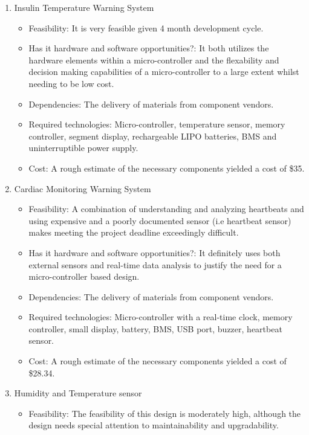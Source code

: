 \begin{enumerate}
  \item Insulin Temperature Warning System
        \begin{itemize}
          \item Feasibility: It is very feasible given 4 month development cycle.
          \item Has it hardware and software opportunities?: It both utilizes the hardware elements within a micro-controller and the flexability and decision making capabilities of a micro-controller to a large extent whilst needing to be low cost.
          \item Dependencies: The delivery of materials from component vendors.
          \item Required technologies: Micro-controller, temperature sensor, memory controller, segment display, rechargeable LIPO batteries, BMS and uninterruptible power supply.
          \item Cost: A rough estimate of the necessary components yielded a cost of \$35.
        \end{itemize}
        \item Cardiac Monitoring Warning System
        \begin{itemize}
          \item Feasibility: A combination of understanding and analyzing heartbeats and using expensive and a poorly documented sensor (i.e heartbeat sensor) makes meeting the project deadline exceedingly difficult.
          \item Has it hardware and software opportunities?: It definitely uses both external sensors and real-time data analysis to justify the need for a micro-controller based design.
          \item Dependencies: The delivery of materials from component vendors.
          \item Required technologies: Micro-controller with a real-time clock, memory controller, small display, battery, BMS, USB port, buzzer, heartbeat sensor.
          \item Cost: A rough estimate of the necessary components yielded a cost of \$28.34.
        \end{itemize}
        \item Humidity and Temperature sensor
        \begin{itemize}
          \item Feasibility: The feasibility of this design is moderately high, although the design needs special attention to maintainability and upgradability.

\end{itemize}
\end{enumerate}
